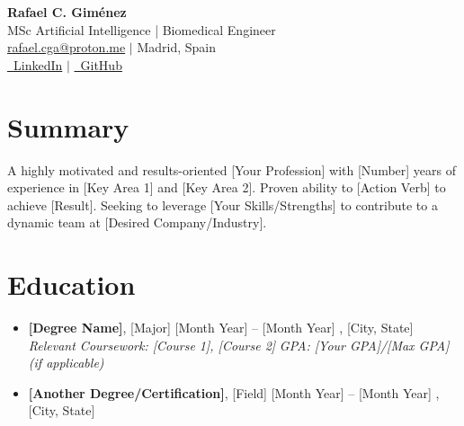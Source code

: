 \documentclass[letterpaper,10pt]{article}
\begin{document}
\begin{center}
    \vspace{-1cm} %
    \color{headerblue}
    {\Huge \bfseries Rafael C. Giménez} \\
    \vspace{3pt}
    \normalsize
    MSc Artificial Intelligence | Biomedical Engineer \\
    \vspace{5pt}
    \color{textgray}
    \href{mailto:rafael.cga@proton.me}{rafael.cga@proton.me} $|$ Madrid, Spain \\
    \vspace{3pt}
    \href{https://www.linkedin.com/in/rafaelcga/}{\faLinkedin\ LinkedIn} $|$ \href{https://github.com/rafaelcga}{\faGithub\ GitHub} \\
\end{center}
\vspace{10pt} %

\section*{Summary}
\vspace{5pt}
\color{textgray}

A highly motivated and results-oriented [Your Profession] with [Number] years of experience in [Key Area 1] and [Key Area 2]. Proven ability to [Action Verb] to achieve [Result]. Seeking to leverage [Your Skills/Strengths] to contribute to a dynamic team at [Desired Company/Industry].

\section*{Education}
\vspace{5pt}
\color{textgray}
\begin{itemize}
    \item \textbf{[Degree Name]}, [Major] \hfill [Month Year] -- [Month Year]
          , [City, State]
          \newline \textit{Relevant Coursework: [Course 1], [Course 2]}
          \newline \textit{GPA: [Your GPA]/[Max GPA] (if applicable)}
    \item \textbf{[Another Degree/Certification]}, [Field] \hfill [Month Year] -- [Month Year]
          , [City, State]
\end{itemize}
\end{document}
